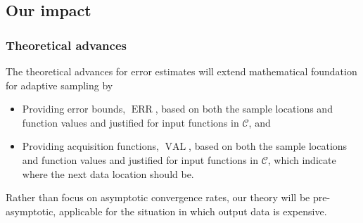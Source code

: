 \documentclass[11pt]{NSFamsart}
\DeclareMathOperator{\QOI}{QOI}
\DeclareMathOperator{\APP}{\widehat{\QOI}}
\DeclareMathOperator{\ERR}{ERR}
\DeclareMathOperator{\VAL}{VAL}
\newcommand{\mX}{\mathsf{X}}
\newcommand{\by}{{\boldsymbol{y}}}
\newcommand{\btheta}{{\boldsymbol{\theta}}}
\newcommand{\calc}{{\mathcal{C}}}
\begin{document}

\subsection{Our impact}
\subsubsection{Theoretical advances}
The theoretical advances for error estimates will extend mathematical foundation for adaptive sampling by 
\begin{itemize}
\item Providing error bounds, $\ERR$, based on both the sample locations and function values and justified for input functions in $\calc$, and 
\item Providing acquisition functions, $\VAL$, based on both the sample locations and function values and justified for input functions in $\calc$, which indicate where the next data location should be.
\end{itemize}
Rather than focus on asymptotic convergence rates, our theory will be pre-asymptotic, applicable for the situation in which output data is expensive.
\end{document}
